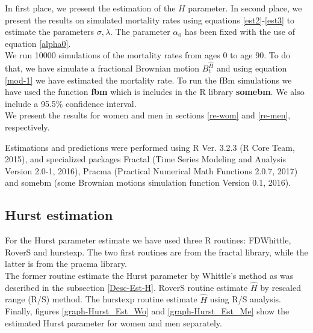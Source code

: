 \documentclass[smallextended]{svjour3}
\begin{document}
In first place, we present the estimation of the $H$ parameter. In second 
place, we present the results on simulated mortality rates using  equations 
\eqref{est2}-\eqref{est3} to estimate the parameters $\sigma,\lambda$. The 
parameter $\alpha_0$ has been fixed with the use of equation \eqref{alpha0}.\\

We run 10000 simulations of the mortality rates from ages $0$ to age $90$. To 
do that, we have simulate a fractional Brownian motion $B_t^{\hat H}$ and using 
equation \eqref{mod-1} we have estimated the mortality rate. To run the fBm 
simulations we have used the function {\bf fbm} which is includes in the R 
library {\bf somebm}.  We also include a  95.5\% confidence interval.\\


We present the results for women and men in sections \ref{re-wom} and 
\ref{re-men}, respectively.

Estimations and predictions were performed using R Ver. 3.2.3 (R Core Team, 
2015), and specialized packages
Fractal (Time Series Modeling and Analysis
Version 2.0-1, 2016), Pracma (Practical Numerical Math Functions 2.0.7, 2017) 
and somebm (some Brownian motions simulation function Version 0.1, 2016).


\subsection{Hurst estimation}\label{hu-est}

For the Hurst parameter estimate we have used three R routines: FDWhittle, 
RoverS and hurstexp.
The two first routines are from the fractal library, while the latter is from 
the pracma library.\\

The former routine estimate the Hurst parameter by Whittle's method as was 
described in the subsection \ref{Desc-Est-H}. RoverS routine
estimate $\hat H $ by rescaled range (R/S) method. The hurstexp routine 
estimate $\hat H $  using
R/S analysis. \\

Finally, figures \ref{graph-Hurst_Est_Wo} and \ref{graph-Hurst_Est_Me} show
the estimated Hurst parameter for women and men separately.
\end{document}

